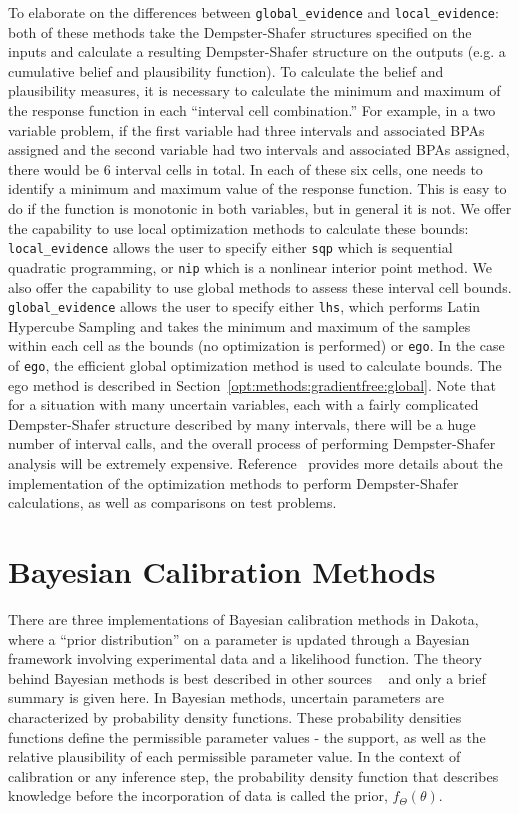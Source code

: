 To elaborate on the differences between \texttt{global\_evidence} and
\texttt{local\_evidence}: both of these methods take the
Dempster-Shafer structures specified on the inputs and calculate a
resulting Dempster-Shafer structure on the outputs (e.g. a cumulative
belief and plausibility function).  To calculate the belief and
plausibility measures, it is necessary to calculate the minimum and
maximum of the response function in each ``interval cell
combination.''  For example, in a two variable problem, if the first
variable had three intervals and associated BPAs assigned and the
second variable had two intervals and associated BPAs assigned, there
would be 6 interval cells in total.  In each of these six cells, one
needs to identify a minimum and maximum value of the response
function. This is easy to do if the function is monotonic in both
variables, but in general it is not. We offer the capability to use
local optimization methods to calculate these bounds:
\texttt{local\_evidence} allows the user to specify either
\texttt{sqp} which is sequential quadratic programming, or
\texttt{nip} which is a nonlinear interior point method. We also offer
the capability to use global methods to assess these interval cell
bounds. \texttt{global\_evidence} allows the user to specify either
\texttt{lhs}, which performs Latin Hypercube Sampling and takes the
minimum and maximum of the samples within each cell as the bounds (no
optimization is performed) or \texttt{ego}. In the case of
\texttt{ego}, the efficient global optimization method is used to
calculate bounds. The ego method is described in
Section~\ref{opt:methods:gradientfree:global}.  Note that for a
situation with many uncertain variables, each with a fairly
complicated Dempster-Shafer structure described by many intervals,
there will be a huge number of interval calls, and the overall process
of performing Dempster-Shafer analysis will be extremely expensive.
Reference~\cite{Tang10b} provides more details about the
implementation of the optimization methods to perform Dempster-Shafer
calculations, as well as comparisons on test problems.

\section{Bayesian Calibration Methods}\label{uq:bayesian}

There are three implementations of Bayesian calibration methods 
in Dakota, where a ``prior distribution'' on a parameter is 
updated through a Bayesian framework involving experimental data and 
a likelihood function. 
The theory behind Bayesian methods is best described in other sources 
~\cite{Kenn01} and only a brief summary is given here. 
In Bayesian methods, uncertain parameters are characterized by probability 
density functions. These probability densities functions define the 
permissible parameter values - the support, as well as the relative
 plausibility of each permissible parameter value. In the context of 
calibration or any inference step, the probability density function 
that describes knowledge before the incorporation of data is called 
the prior, $f_\Theta\left( \theta  \right)$.
 
